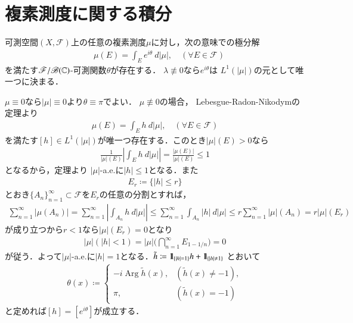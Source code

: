 \section{複素測度に関する積分}
	\begin{screen}
		\begin{thm}[複素測度の極分解]\label{thm:polar_decomposition_of_complex_measures}
			可測空間$(X,\mathscr{F})$上の任意の複素測度$\mu$に対し，次の意味での極分解
			\begin{align}
				\quad \mu(E) = \int_E e^{i\theta}\ d|\mu|,
				\quad (\forall E \in \mathscr{F})
			\end{align}
			を満たす$\mathscr{F}/\mathscr{B}(\mathbb{C})$-可測関数$\theta$が存在する．
			$\lambda \not\equiv 0$なら$e^{i \theta}$は
			$L^1(|\mu|)$の元として唯一つに決まる．
		\end{thm}
	\end{screen}
	
	\begin{prf} $\mu \equiv 0$なら$|\mu| \equiv 0$より$\theta \equiv \pi$でよい．
		$\mu \not\equiv 0$の場合，
		Lebesgue-Radon-Nikodymの定理より
		\begin{align}
			\mu(E) = \int_E h\ d|\mu|,
			\quad (\forall E \in \mathscr{F})
		\end{align}
		を満たす$[h] \in L^1(|\mu|)$が唯一つ存在する．このとき$|\mu|(E) > 0$なら
		\begin{align}
			\frac{1}{|\mu|(E)} \left| \int_E h\ d|\mu| \right|
			= \frac{|\mu(E)|}{|\mu|(E)} \leq 1
		\end{align}
		となるから，定理より
		$|\mu|$-a.e.に$|h| \leq 1$となる．また
		\begin{align}
			E_r \coloneqq \{|h| \leq r\}
		\end{align}
		とおき$\{A_n\}_{n=1}^\infty \subset \mathscr{F}$を$E_r$の任意の分割とすれば，
		\begin{align}
			\sum_{n=1}^\infty |\mu(A_n)|
			= \sum_{n=1}^\infty \left|\int_{A_n} h\ d|\mu|\right|
			\leq \sum_{n=1}^\infty \int_{A_n} |h|\ d|\mu|
			\leq r \sum_{n=1}^\infty |\mu|(A_n)
			= r |\mu|(E_r)
		\end{align}
		が成り立つから$r < 1$なら$|\mu|(E_r) = 0$となり
		\begin{align}
			|\mu|\left(|h|< 1 \right)
			= |\mu| \Biggl(\bigcap_{n=1}^\infty E_{1-1/n} \Biggr)
			= 0
		\end{align}
		が従う．よって$|\mu|$-a.e.に$|h|=1$となる．$\tilde{h} \coloneqq \mbox{1}\hspace{-0.25em}\mbox{l}_{\{|h|=1\}}h + \mbox{1}\hspace{-0.25em}\mbox{l}_{\{|h|\neq1\}}$
		とおいて
		\begin{align}
			\theta(x) \coloneqq
			\begin{cases}
				-i \operatorname{Arg} \tilde{h}(x), & (\tilde{h}(x) \neq -1), \\
				\pi, & (\tilde{h}(x) = -1)
			\end{cases}
		\end{align}
		と定めれば$[h] = [e^{i \theta}]$が成立する．
		\QED
	\end{prf}
	
